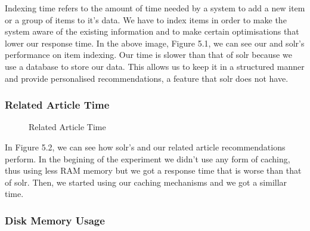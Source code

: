 Indexing time refers to the amount of time needed by a system to add a new item or a group of items to it's data. We have to index items in order to make the system aware of the existing information and to make certain optimisations that lower our response time.
In the above image, Figure 5.1, we can see our and solr's performance on item indexing. Our time is slower than that of solr because we use a database to store our data. This allows us to keep it in a structured manner and provide personalised recommendations, a feature that solr does not have.

\subsubsection{Related Article Time}
\label{sec:related-articles-time}

\begin{figure}[h]
\centering
\caption{Related Article Time}

\label{tikz}
\end{figure}

In Figure 5.2, we can see how solr's and our related article recommendations perform. In the begining of the experiment we didn't use any form of caching, thus using less RAM memory but we got a response time that is worse than that of solr. Then, we started using our caching mechanisms and we got a simillar time.
\subsubsection{Disk Memory Usage}
\label{sec:disk-memory-usage}

